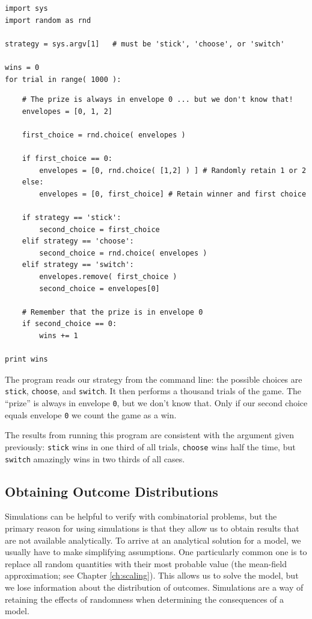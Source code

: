\begin{verbatim}
import sys
import random as rnd

strategy = sys.argv[1]   # must be 'stick', 'choose', or 'switch'

wins = 0
for trial in range( 1000 ):    
\end{verbatim}
\begin{verbatim}
    # The prize is always in envelope 0 ... but we don't know that!
    envelopes = [0, 1, 2]

    first_choice = rnd.choice( envelopes )

    if first_choice == 0:
        envelopes = [0, rnd.choice( [1,2] ) ] # Randomly retain 1 or 2
    else:
        envelopes = [0, first_choice] # Retain winner and first choice

    if strategy == 'stick':
        second_choice = first_choice
    elif strategy == 'choose':
        second_choice = rnd.choice( envelopes )
    elif strategy == 'switch':
        envelopes.remove( first_choice )
        second_choice = envelopes[0]

    # Remember that the prize is in envelope 0
    if second_choice == 0:
        wins += 1

print wins
\end{verbatim}

The program reads our strategy from the command line: the possible
choices are \texttt{stick}, \texttt{choose}, and \texttt{switch}. It
then performs a thousand trials of the game. The ``prize'' is always
in envelope \texttt{0}, but we don't know that. Only if our second
choice equals envelope \texttt{0} we count the game as a win.

The results from running this program are consistent with the argument
given previously: \texttt{stick} wins in one third of all trials,
\texttt{choose} wins half the time, but \texttt{switch} amazingly wins
in two thirds of all cases.


\subsection{Obtaining Outcome Distributions}

  
Simulations can be helpful to verify with combinatorial problems, but
the primary reason for using simulations is that they allow us to
obtain results that are not available analytically. To arrive at an
analytical solution for a model, we usually have to make simplifying
assumptions. One particularly common one is to replace all random
quantities with their most probable value (the mean-field
approximation; see Chapter \ref{ch:scaling}). This allows us to solve
the model, but we lose information about the distribution of outcomes.
Simulations are a way of retaining the effects of randomness when
determining the consequences of a model.

